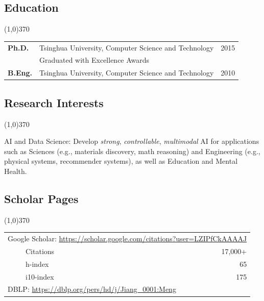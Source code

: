 \documentclass[10pt]{article}
\begin{document}
\vspace{-0.2cm}
\subsection{\sc Education}
\vspace{-0.4cm} \line(1,0){370} \vspace{-0.1cm}

\begin{table}[h!]
\begin{tabular*}{12.7cm}{p{1.15cm}p{10.00cm}r}
\bf{Ph.D.}&Tsinghua University, Computer Science and Technology&2015\\
&\multicolumn{2}{l}{Graduated with Excellence Awards} \\ %
\bf{B.Eng.}&Tsinghua University, Computer Science and Technology&2010

\end{tabular*}
\end{table}

\vspace{-0.6cm}
\subsection{\sc Research Interests}
\vspace{-0.4cm} \line(1,0){370} \vspace{0.1cm}

AI and Data Science: Develop \emph{strong}, \emph{controllable}, \emph{multimodal} AI for applications such as Sciences (e.g., materials discovery, math reasoning) and Engineering (e.g., physical systems, recommender systems), as well as Education and Mental Health.

\subsection{\sc Scholar Pages}
\vspace{-0.4cm} \line(1,0){370} \vspace{-0.5cm}
\begin{table}[h!]
\begin{tabular*}{12.7cm}{p{11.65cm}r}
\multicolumn{2}{l}{Google Scholar: \url{https://scholar.google.com/citations?user=LZIPfCkAAAAJ}} \\
~~~~~Citations & 17,000+ \\
~~~~~h-index & 65 \\
~~~~~i10-index & 175 \\
\multicolumn{2}{l}{DBLP: \url{https://dblp.org/pers/hd/j/Jiang\_0001:Meng}} \\
\end{tabular*}
\end{table}
\end{document}
